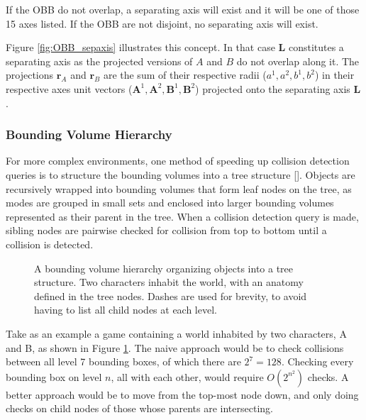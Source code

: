 If the \gls{OBB} do not overlap, a separating axis will exist and it will be one of those 15 axes listed. If the \gls{OBB} are not disjoint, no separating axis will exist.

Figure \ref{fig:OBB_sepaxis} illustrates this concept. In that case $\textbf{L}$ constitutes a separating axis as the projected versions of $A$ and $B$ do not overlap along it. The projections $\textbf{r}_A$ and $\textbf{r}_B$ are the sum of their respective radii ($a^1, a^2, b^1, b^2$) in their respective axes unit vectors ($\textbf{A}^1, \textbf{A}^2, \textbf{B}^1, \textbf{B}^2$) projected onto the separating axis $\textbf{L}$.

\subsubsection{Bounding Volume Hierarchy}

For more complex environments, one method of speeding up collision detection queries is to structure the bounding volumes into a tree structure [\citeauthor{Haverkort2004}]. Objects are recursively wrapped into bounding volumes that form leaf nodes on the tree, as modes are grouped in small sets and enclosed into larger bounding volumes represented as their parent in the tree. When a collision detection query is made, sibling nodes are pairwise checked for collision from top to bottom until a collision is detected. 

\begin{figure}[h]
	
	\caption{A bounding volume hierarchy organizing objects into a tree structure. Two characters inhabit the world, with an anatomy defined in the tree nodes. Dashes are used for brevity, to avoid having to list all child nodes at each level.}
	\label{fig:BVH_tree}
\end{figure}

Take as an example a game containing a world inhabited by two characters, A and B, as shown in Figure \ref{fig:BVH_tree}. The naive approach would be to check collisions between all level 7 bounding boxes, of which there are $2^7 = 128$. Checking every bounding box on level $n$, all with each other, would require $O(2^{n^2})$ checks. A better approach would be to move from the top-most node down, and only doing checks on child nodes of those whose parents are intersecting.

